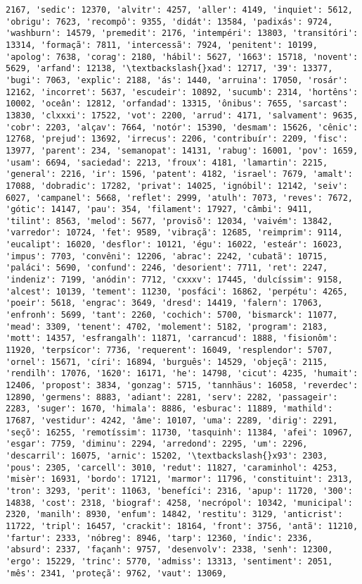 \documentclass[11pt]{article}
\begin{document}
\begin{Verbatim}[commandchars=\\\{\}]
2167, 'sedic': 12370, 'alvitr': 4257, 'aller': 4149, 'inquiet': 5612, 'obrigu': 7623, 'recompô': 9355, 'didát': 13584, 'padixás': 9724, 'washburn': 14579, 'premedit': 2176, 'intempéri': 13803, 'transitóri': 13314, 'formaçã': 7811, 'intercessã': 7924, 'penitent': 10199, 'apolog': 7638, 'corag': 2180, 'hábil': 5627, '1663': 15718, 'novent': 5629, 'arfand': 12138, '\textbackslash{}xad': 12717, '39': 13377, 'bugi': 7063, 'explic': 2188, 'ás': 1440, 'arruina': 17050, 'rosár': 12162, 'incorret': 5637, 'escudeir': 10892, 'sucumb': 2314, 'hortêns': 10002, 'oceân': 12812, 'orfandad': 13315, 'ônibus': 7655, 'sarcast': 13830, 'clxxxi': 17522, 'vot': 2200, 'arrud': 4171, 'salvament': 9635, 'cobr': 2203, 'alçav': 7664, 'notór': 15390, 'desmam': 15626, 'cênic': 12768, 'prejud': 13692, 'irrecus': 2206, 'contribuír': 2209, 'fisc': 13977, 'parent': 234, 'semanopat': 14131, 'rabug': 16001, 'pov': 1659, 'usam': 6694, 'saciedad': 2213, 'froux': 4181, 'lamartin': 2215, 'general': 2216, 'ir': 1596, 'patent': 4182, 'israel': 7679, 'amalt': 17088, 'dobradic': 17282, 'privat': 14025, 'ignóbil': 12142, 'seiv': 6027, 'campanel': 5668, 'reflet': 2999, 'atulh': 7073, 'reves': 7672, 'gótic': 14147, 'pau': 354, 'filament': 17927, 'câmbi': 9411, 'tilint': 8563, 'melod': 5677, 'provisõ': 12034, 'vaivém': 13842, 'varredor': 10724, 'fet': 9589, 'vibraçã': 12685, 'reimprim': 9114, 'eucalipt': 16020, 'desflor': 10121, 'égu': 16022, 'esteár': 16023, 'impus': 7703, 'convêni': 12206, 'abrac': 2242, 'cubatã': 10715, 'paláci': 5690, 'confund': 2246, 'desorient': 7711, 'ret': 2247, 'indeniz': 7199, 'anódin': 7712, 'cxxxv': 17445, 'dulcíssim': 9158, 'alcest': 10139, 'tement': 11230, 'posfáci': 16862, 'perpétu': 4265, 'poeir': 5618, 'engrac': 3649, 'dresd': 14419, 'falern': 17063, 'enfronh': 5699, 'tant': 2260, 'cochich': 5700, 'bismarck': 11077, 'mead': 3309, 'tenent': 4702, 'molement': 5182, 'program': 2183, 'mott': 14357, 'esfrangalh': 11871, 'carrancud': 1888, 'fisionôm': 11920, 'terpsícor': 7736, 'requerent': 16049, 'resplendor': 5707, 'ornel': 15671, 'círi': 16894, 'burguês': 14529, 'objeçã': 2115, 'rendilh': 17076, '1620': 16171, 'he': 14798, 'cicut': 4235, 'humait': 12406, 'propost': 3834, 'gonzag': 5715, 'tannhäus': 16058, 'reverdec': 12890, 'germens': 8883, 'adiant': 2281, 'serv': 2282, 'passageir': 2283, 'suger': 1670, 'himala': 8886, 'esburac': 11889, 'mathild': 17687, 'vestidur': 4242, 'âme': 10107, 'uma': 2289, 'dirig': 2291, 'seçõ': 16255, 'remotíssim': 11730, 'tasquinh': 11384, 'afei': 10967, 'esgar': 7759, 'diminu': 2294, 'arredond': 2295, 'um': 2296, 'descarril': 16075, 'arnic': 15202, '\textbackslash{}x93': 2303, 'pous': 2305, 'carcell': 3010, 'redut': 11827, 'caraminhol': 4253, 'misèr': 16931, 'bordo': 17121, 'marmor': 11796, 'constituint': 2313, 'tron': 3293, 'perit': 11063, 'benefíci': 2316, 'apup': 11720, '300': 14838, 'cost': 2318, 'biograf': 4258, 'necrópol': 10342, 'municipal': 2320, 'manilh': 8930, 'enfum': 14842, 'restitu': 3129, 'anticrist': 11722, 'tripl': 16457, 'crackit': 18164, 'front': 3756, 'antã': 11210, 'fartur': 2333, 'nóbreg': 8946, 'tarp': 12360, 'índic': 2336, 'absurd': 2337, 'façanh': 9757, 'desenvolv': 2338, 'senh': 12300, 'ergo': 15229, 'trinc': 5770, 'admiss': 13313, 'sentiment': 2051, 'mês': 2341, 'proteçã': 9762, 'vaut': 13069, 
\end{Verbatim}
\end{document}
